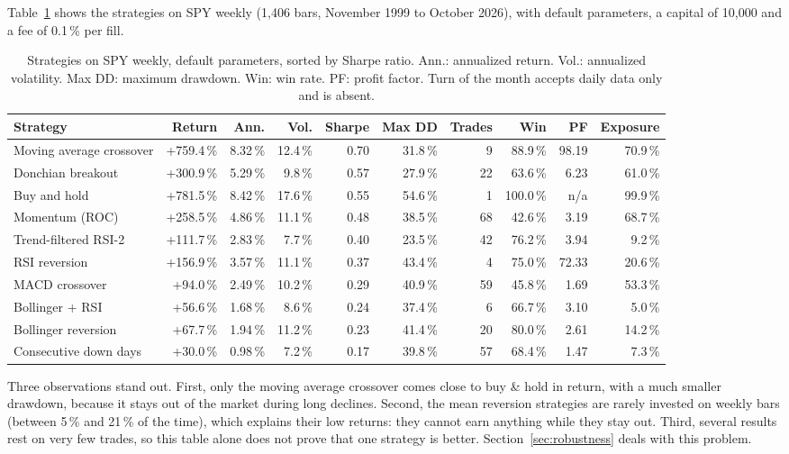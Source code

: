 \documentclass[11pt,a4paper]{article}
\begin{document}
Table~\ref{tab:spy} shows the strategies on SPY weekly (1,406 bars, November 1999 to October 2026), with default parameters, a capital of 10,000 and a fee of 0.1\,\% per fill.

\begin{table}[H]
\centering\small
\setlength{\tabcolsep}{4pt}\footnotesize
\begin{tabular}{lrrrrrrrrr}
\toprule
\textbf{Strategy} & \textbf{Return} & \textbf{Ann.} & \textbf{Vol.} & \textbf{Sharpe} & \textbf{Max DD} & \textbf{Trades} & \textbf{Win} & \textbf{PF} & \textbf{Exposure} \\
\midrule
Moving average crossover & +759.4\,\% & 8.32\,\% & 12.4\,\% & 0.70 & 31.8\,\% & 9 & 88.9\,\% & 98.19 & 70.9\,\% \\
Donchian breakout & +300.9\,\% & 5.29\,\% & 9.8\,\% & 0.57 & 27.9\,\% & 22 & 63.6\,\% & 6.23 & 61.0\,\% \\
Buy and hold & +781.5\,\% & 8.42\,\% & 17.6\,\% & 0.55 & 54.6\,\% & 1 & 100.0\,\% & n/a & 99.9\,\% \\
Momentum (ROC) & +258.5\,\% & 4.86\,\% & 11.1\,\% & 0.48 & 38.5\,\% & 68 & 42.6\,\% & 3.19 & 68.7\,\% \\
Trend-filtered RSI-2 & +111.7\,\% & 2.83\,\% & 7.7\,\% & 0.40 & 23.5\,\% & 42 & 76.2\,\% & 3.94 & 9.2\,\% \\
RSI reversion & +156.9\,\% & 3.57\,\% & 11.1\,\% & 0.37 & 43.4\,\% & 4 & 75.0\,\% & 72.33 & 20.6\,\% \\
MACD crossover & +94.0\,\% & 2.49\,\% & 10.2\,\% & 0.29 & 40.9\,\% & 59 & 45.8\,\% & 1.69 & 53.3\,\% \\
Bollinger + RSI & +56.6\,\% & 1.68\,\% & 8.6\,\% & 0.24 & 37.4\,\% & 6 & 66.7\,\% & 3.10 & 5.0\,\% \\
Bollinger reversion & +67.7\,\% & 1.94\,\% & 11.2\,\% & 0.23 & 41.4\,\% & 20 & 80.0\,\% & 2.61 & 14.2\,\% \\
Consecutive down days & +30.0\,\% & 0.98\,\% & 7.2\,\% & 0.17 & 39.8\,\% & 57 & 68.4\,\% & 1.47 & 7.3\,\% \\
\bottomrule
\end{tabular}
\caption{Strategies on SPY weekly, default parameters, sorted by Sharpe ratio. Ann.: annualized return. Vol.: annualized volatility. Max DD: maximum drawdown. Win: win rate. PF: profit factor. Turn of the month accepts daily data only and is absent.}
\label{tab:spy}
\end{table}

Three observations stand out. First, only the moving average crossover comes close to buy \& hold in return, with a much smaller drawdown, because it stays out of the market during long declines. Second, the mean reversion strategies are rarely invested on weekly bars (between 5\,\% and 21\,\% of the time), which explains their low returns: they cannot earn anything while they stay out. Third, several results rest on very few trades, so this table alone does not prove that one strategy is better. Section~\ref{sec:robustness} deals with this problem.
\end{document}
